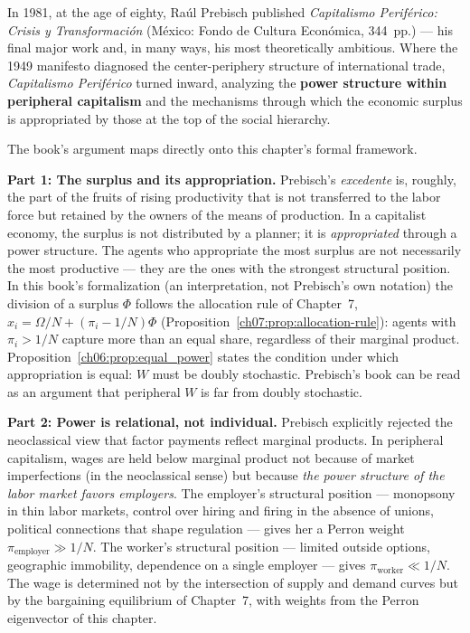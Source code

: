 \documentclass[../structural_economics_book.tex]{subfiles}
\begin{document}
In 1981, at the age of eighty, Ra\'{u}l Prebisch published \textit{Capitalismo Perif\'{e}rico: Crisis y Transformaci\'{o}n} (M\'{e}xico: Fondo de Cultura Econ\'{o}mica, 344~pp.) --- his final major work and, in many ways, his most theoretically ambitious. Where the 1949 manifesto diagnosed the center-periphery structure of international trade, \textit{Capitalismo Perif\'{e}rico} turned inward, analyzing the \textbf{power structure within peripheral capitalism} and the mechanisms through which the economic surplus is appropriated by those at the top of the social hierarchy.

The book's argument maps directly onto this chapter's formal framework.

\textbf{Part 1: The surplus and its appropriation.} Prebisch's \textit{excedente} is, roughly, the part of the fruits of rising productivity that is not transferred to the labor force but retained by the owners of the means of production. In a capitalist economy, the surplus is not distributed by a planner; it is \textit{appropriated} through a power structure. The agents who appropriate the most surplus are not necessarily the most productive --- they are the ones with the strongest structural position. In this book's formalization (an interpretation, not Prebisch's own notation) the division of a surplus $\Phi$ follows the allocation rule of Chapter~7, $x_i = \Omega/N + (\pi_i - 1/N)\Phi$ (Proposition~\ref{ch07:prop:allocation-rule}): agents with $\pi_i > 1/N$ capture more than an equal share, regardless of their marginal product. Proposition~\ref{ch06:prop:equal_power} states the condition under which appropriation is equal: $W$ must be doubly stochastic. Prebisch's book can be read as an argument that peripheral $W$ is far from doubly stochastic.

\textbf{Part 2: Power is relational, not individual.} Prebisch explicitly rejected the neoclassical view that factor payments reflect marginal products. In peripheral capitalism, wages are held below marginal product not because of market imperfections (in the neoclassical sense) but because \textit{the power structure of the labor market favors employers}. The employer's structural position --- monopsony in thin labor markets, control over hiring and firing in the absence of unions, political connections that shape regulation --- gives her a Perron weight $\pi_{\text{employer}} \gg 1/N$. The worker's structural position --- limited outside options, geographic immobility, dependence on a single employer --- gives $\pi_{\text{worker}} \ll 1/N$. The wage is determined not by the intersection of supply and demand curves but by the bargaining equilibrium of Chapter~7, with weights from the Perron eigenvector of this chapter.
\end{document}
